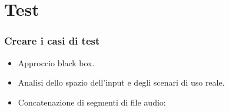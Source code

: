 
\section{Test}
\begin{frame}
  \frametitle{Creare i casi di test}
  \begin{itemize}
    \item
      Approccio black box. 
    \item
      Analisi dello spazio dell'input e degli scenari di uso reale.
    \item
      Concatenazione di segmenti di file audio:
% 
% 
%     
%     
%     
%       
%     
%     
% 
% 

\end{itemize}
\end{frame}
